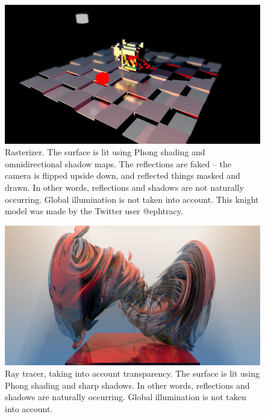 \documentclass[12pt]{article}
\begin{document}
\begin{figure} 
\centering
  \includegraphics[width = 6 in]{fig1.png}
  \caption{ Rasterizer.
The surface is lit using Phong shading and omnidirectional shadow maps.
The reflections are faked -- the camera is flipped upside down, and reflected things masked and drawn.
In other words, reflections and shadows are not naturally occurring.
Global illumination is not taken into account.
This knight model was made by the Twitter user @ephtracy.
}

\end{figure}






\begin{figure} 
\centering
  \includegraphics[width = 6 in]{fig2.png}
  \caption{ Ray tracer, taking into account transparency.
The surface is lit using Phong shading and sharp shadows.
In other words, reflections and shadows are naturally occurring.
Global illumination is not taken into account.
}
\end{figure}
\end{document}
